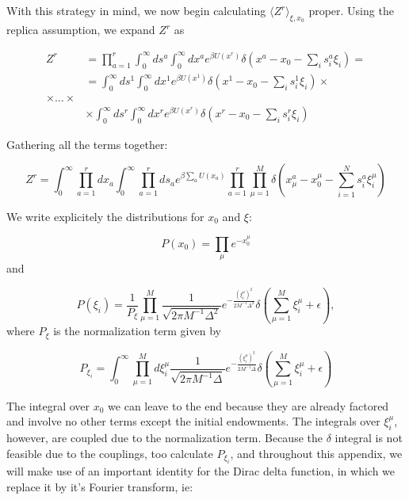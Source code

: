 With this strategy in mind, we now begin calculating $\langle Z^r
\rangle_{\xi, x_0}$ proper. Using the replica assumption, we expand
$Z^r$ as

\begin{align}
    \label{eq:a_23}
    Z^r & = \prod_{a=1}^r \int_0^\infty ds^a \int_0^\infty dx^a e^{\beta U(x^r)}
    \delta\left(x^a - x_0 - \sum_i s^a_i \xi_i \right) = \\
   & = \int_0^\infty ds^1 \int_0^\infty dx^1 e^{\beta U(x^1)}
    \delta\left(x^1 - x_0 - \sum_i s^1_i \xi_i \right) \times \\
  \times \ldots \times \\
        &\times \int_0^\infty ds^r \int_0^\infty dx^r e^{\beta U(x^r)}
    \delta\left(x^r - x_0 - \sum_i s^r_i \xi_i \right) \nonumber
\end{align}

Gathering all the terms together:

  \begin{equation}
    \label{eq:a_22}
    Z^r = \int_0^\infty \prod_{a=1}^r d x_a \int_0^\infty 
    \prod_{a=1}^r d s_a e^{\beta \sum_a U(x_a)} \prod_{a=1}^r
    \prod_{\mu=1}^M \delta \left( x_\mu^a - x_0^\mu - \sum_{i=1}^N s_i^a \xi_i^\mu\right)
  \end{equation}


We write explicitely the distributions for $x_0$ and $\xi$:

\begin{equation}
    \label{eq:a_24}
    P(x_0) = \prod_\mu e^{-x_0^\mu}
\end{equation}
and

\begin{equation}
    \label{eq:a_25}
    P(\xi_i) = \frac{1}{P_\xi} \prod_{\mu=1}^M \frac{1}{\sqrt{2\pi M^{-1} \Delta^2}}e^{-\frac{(\xi_i^\mu)^2}{2M^{-1}\Delta^2}}
    \delta\left(\sum_{\mu=1}^M \xi_i^\mu + \epsilon\right),
\end{equation}
where $P_\xi$ is the normalization term given by

\begin{equation}
  \label{eq:a_26}
  P_{\xi_i} = \int_0^\infty \prod_{\mu=1}^M d\xi_i^\mu \frac{1}{\sqrt{2\pi M^{-1}\Delta}}e^{-\frac{(\xi_i^\mu)^2}{2 M^{-1}\Delta}}
    \delta\left(\sum_{\mu=1}^M \xi_i^\mu + \epsilon\right)
\end{equation}

The integral over $x_0$ we can leave to the end because they are
already factored and involve no other terms except the initial
endowments. The integrals over $\xi_i^\mu$, however, are coupled due
to the normalization term. Because the $\delta$ integral is not
feasible due to the couplings, too calculate $P_{\xi_i}$, and throughout
this appendix, we will make use of an important identity for the Dirac
delta function, in which we replace it by it's Fourier transform, ie:

